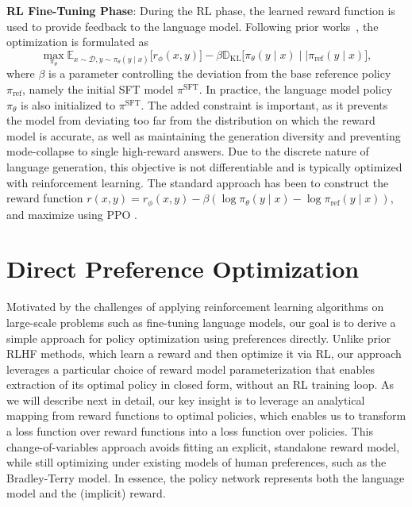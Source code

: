 \documentclass{article}
\newcommand{\rev}[2]{{#2}}
\newcommand{\piref}{\pi_\text{ref}}
\newcommand{\pisft}{\pi^\text{SFT}}
\begin{document}
\textbf{RL Fine-Tuning Phase}: During the RL phase, the learned reward function is used to provide feedback to the language model. Following prior works~\citep{jaques2017sequence, jaques2020human}, the optimization is formulated as
\begin{equation}\label{eq:RL}
\max_{\pi_{\theta}}  \mathbb{E}_{x\sim \mathcal{D}, y\sim \pi_{\theta}(y \mid x)}\bigl[r_{\phi}(x, y)\bigr] - \beta\mathbb{D}_{\textrm{KL}}\bigl[\pi_{\theta}(y\mid x)\mid \mid \piref(y\mid x)\bigr],
\end{equation}
where $\beta$ is a parameter controlling the deviation from the base reference policy $\piref$, namely the initial SFT model $\pisft$. 
In practice, the language model policy $\pi_\theta$ is also initialized to $\pisft$. The added constraint is important, as it prevents the model from deviating too far from the distribution on which the reward model is accurate, as well as maintaining the generation diversity and preventing mode-collapse to single high-reward answers. Due to the discrete nature of language generation, this objective is not differentiable and is typically optimized with reinforcement learning. The standard approach \citep{ziegler2020finetuning, stiennon2022learning, bai2022training, ouyang2022training} has been to construct the reward function ${r(x, y) = r_{\phi}(x, y) -\beta (\log \pi_{\theta}(y\mid x) - \log \piref(y\mid x))}$, and maximize using PPO \cite{schulman2017proximal}. 

\section{Direct Preference Optimization}\label{sec:DPO}

Motivated by the challenges of applying reinforcement learning algorithms on large-scale problems such as fine-tuning language models, our goal is to derive a simple approach for policy optimization using preferences directly. Unlike prior RLHF methods, which learn a reward and then optimize it via RL, our approach \rev{bypasses the reward modeling step and directly optimizes a language model using preference data}{leverages a particular choice of reward model parameterization that enables extraction of its optimal policy in closed form, without an RL training loop}. 
As we will describe next in detail, our key insight is to leverage an analytical mapping from reward functions to optimal policies, which enables us to transform a loss function over reward functions into a loss function over policies.
This change-of-variables approach \rev{allows us to skip the explicit reward modeling step}{avoids fitting an explicit, standalone reward model}, while still optimizing under existing models of human preferences, such as the Bradley-Terry model. In essence, the policy network represents both the language model and the \rev{}{(implicit)} reward.
\end{document}
